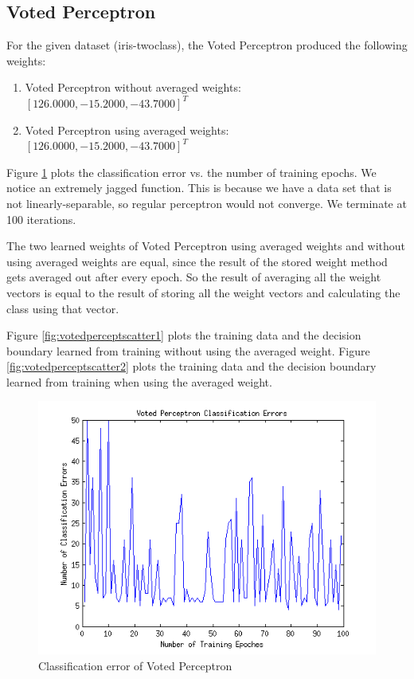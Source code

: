 \documentclass[12pt]{article}
\begin{document}
\subsection{Voted Perceptron}

For the given dataset (iris-twoclass), the Voted Perceptron produced the following weights:

\begin{enumerate}
	\item Voted Perceptron without averaged weights:\\ \([126.0000, -15.2000, -43.7000]^T\)
	\item Voted Perceptron using averaged weights:\\ \([126.0000, -15.2000, -43.7000]^T\)
\end{enumerate}

Figure \ref{fig:votedpercepterror} plots the classification error vs. the number of training epochs. We notice an extremely jagged function. This is because we have a data set that is not linearly-separable, so regular perceptron would not converge. We terminate at 100 iterations.

The two learned weights of Voted Perceptron using averaged weights and without using averaged weights are equal, since the result of the stored weight method gets averaged out after every epoch. So the result of averaging all the weight vectors is equal to the result of storing all the weight vectors and calculating the class using that vector.

Figure \ref{fig:votedperceptscatter1} plots the training data and the decision boundary learned from training without using the averaged weight. Figure \ref{fig:votedperceptscatter2} plots the training data and the decision boundary learned from training when using the averaged weight.

\begin{figure}[!t]
  \centering
  \includegraphics[scale=.70]{img/voted_errors.png}
  \caption{Classification error of Voted Perceptron}
  \label{fig:votedpercepterror}
\end{figure}
\end{document}
